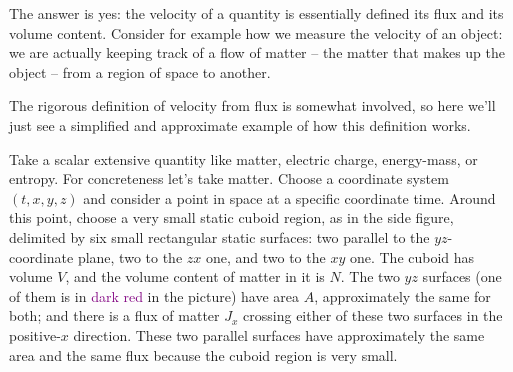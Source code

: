 \documentclass[a4paper,12pt,%
onecolumn,oneside,%
british%
]{memoir}
\renewcommand*{\|}[1][]{\nonscript\:#1\vert\nonscript\:\mathopen{}}
\newcommand*{\energym}{energy-mass}
\newcommand*{\yN}{N}
\newcommand*{\yJ}{J}
\begin{document}
The answer is yes: the velocity of a quantity is essentially defined its flux and its volume content. Consider for example how we measure the velocity of an object: we are actually keeping track of a flow of matter -- the matter that makes up the object -- from a region of space to another.

The rigorous definition of velocity from flux is somewhat involved, so here we'll just see a simplified and approximate example of how this definition works.

Take a scalar extensive quantity like matter, electric charge, \energym, or entropy. For concreteness let's take matter. Choose a coordinate system $(t,x,y,z)$ and consider a point in space at a specific coordinate time.
%
%
Around this point, choose a very small static cuboid region, as in the side figure, delimited by six small rectangular static surfaces: two parallel to the $yz$-coordinate plane, two to the $zx$ one, and two to the $xy$ one. The cuboid has volume $V$, and the volume content of matter in it is $\yN$. The two $yz$ surfaces (one of them is in \textcolor{purple}{dark red} in the picture) have area $A$, approximately the same for both; and there is a flux of matter $\yJ_{x}$ crossing either of these two surfaces in the positive-$x$ direction. These two parallel surfaces have approximately the same area and the same flux because the cuboid region is very small.
\end{document}

